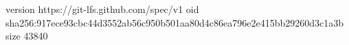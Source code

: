 version https://git-lfs.github.com/spec/v1
oid sha256:917ece93cbc44d3552ab56c950b501aa80d4c86ea796e2e415bb29260d3c1a3b
size 43840
